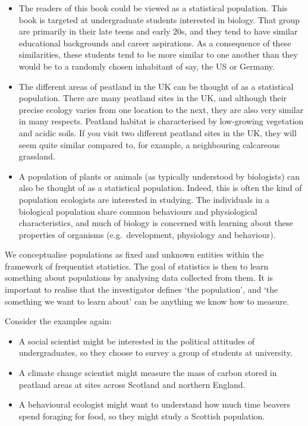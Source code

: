 \documentclass[
]{book}
\providecommand{\tightlist}{%
  \setlength{\itemsep}{0pt}\setlength{\parskip}{0pt}}
\begin{document}
\begin{itemize}
\tightlist
\item
  The readers of this book could be viewed as a statistical population. This book is targeted at undergraduate students interested in biology. That group are primarily in their late teens and early 20s, and they tend to have similar educational backgrounds and career aspirations. As a consequence of these similarities, these students tend to be more similar to one another than they would be to a randomly chosen inhabitant of say, the US or Germany.
\item
  The different areas of peatland in the UK can be thought of as a statistical population. There are many peatland sites in the UK, and although their precise ecology varies from one location to the next, they are also very similar in many respects. Peatland habitat is characterised by low-growing vegetation and acidic soils. If you visit two different peatland sites in the UK, they will seem quite similar compared to, for example, a neighbouring calcareous grassland.
\item
  A population of plants or animals (as typically understood by biologists) can also be thought of as a statistical population. Indeed, this is often the kind of population ecologists are interested in studying. The individuals in a biological population share common behaviours and physiological characteristics, and much of biology is concerned with learning about these properties of organisms (e.g.~development, physiology and behaviour).
\end{itemize}

We conceptualise populations as fixed and unknown entities within the framework of frequentist statistics. The goal of statistics is then to learn something about populations by analysing data collected from them. It is important to realise that the investigator defines `the population', and `the something we want to learn about' can be anything we know how to measure.

Consider the examples again:

\begin{itemize}
\tightlist
\item
  A social scientist might be interested in the political attitudes of undergraduates, so they choose to survey a group of students at university.
\item
  A climate change scientist might measure the mass of carbon stored in peatland areas at sites across Scotland and northern England.
\item
  A behavioural ecologist might want to understand how much time beavers spend foraging for food, so they might study a Scottish population.
\end{itemize}
\end{document}
